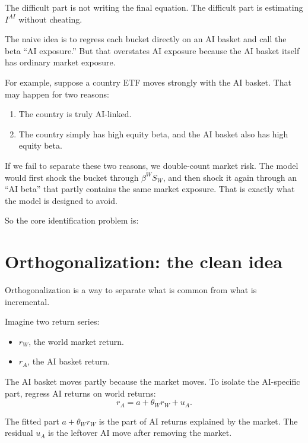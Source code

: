 \documentclass[10pt]{article}
\begin{document}
The difficult part is not writing the final equation. The difficult part is estimating $I^{AI}$ without cheating.

The naive idea is to regress each bucket directly on an AI basket and call the beta ``AI exposure.'' But that overstates AI exposure because the AI basket itself has ordinary market exposure.

For example, suppose a country ETF moves strongly with the AI basket. That may happen for two reasons:

\begin{enumerate}
\item The country is truly AI-linked.
\item The country simply has high equity beta, and the AI basket also has high equity beta.
\end{enumerate}

If we fail to separate these two reasons, we double-count market risk. The model would first shock the bucket through $\beta^W S_W$, and then shock it again through an ``AI beta'' that partly contains the same market exposure. That is exactly what the model is designed to avoid.

So the core identification problem is:

\begin{center}
\end{center}

\section{Orthogonalization: the clean idea}

Orthogonalization is a way to separate what is common from what is incremental.

Imagine two return series:

\begin{itemize}
\item $r_W$, the world market return.
\item $r_A$, the AI basket return.
\end{itemize}

The AI basket moves partly because the market moves. To isolate the AI-specific part, regress AI returns on world returns:
\[
r_A=a+\theta_W r_W+u_A.
\]

The fitted part $a+\theta_W r_W$ is the part of AI returns explained by the market. The residual $u_A$ is the leftover AI move after removing the market.
\end{document}
